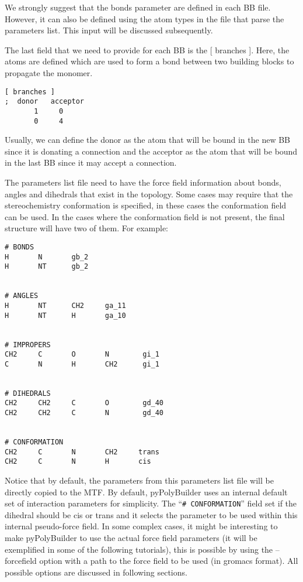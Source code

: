 \documentclass[12pt]{article}
\begin{document}
We strongly suggest that the bonds parameter are defined in each BB file.
However, it can also be defined using the atom types in the file that parse the parameters list.
This input will be discussed subsequently.

The last field that we need to provide for each BB is the [ branches ].
Here, the atoms are defined which are used to form a bond between two building blocks to propagate the monomer.
\begin{lstlisting}
[ branches ]
;  donor   acceptor
       1	 0
       0	 4
\end{lstlisting}

Usually, we can define the donor as the atom that will be bound in the new BB since it is donating a connection and the acceptor as the atom that will be bound in the last BB since it may accept a connection.

The parameters list file need to have the force field information about bonds, angles and dihedrals that exist in the topology.
Some cases may require that the stereochemistry conformation is specified, in these cases the conformation field can be used. In the cases where the conformation field is not present, the  final structure will have two of them. For example:

\begin{lstlisting}
# BONDS
H       N       gb_2
H       NT      gb_2
   

# ANGLES
H       NT      CH2     ga_11
H       NT      H       ga_10


# IMPROPERS
CH2     C       O       N        gi_1
C       N       H       CH2      gi_1


# DIHEDRALS
CH2     CH2     C       O        gd_40
CH2     CH2     C       N        gd_40


# CONFORMATION
CH2     C       N       CH2     trans
CH2     C       N       H       cis  
\end{lstlisting}

Notice that by default, the parameters from this parameters list file will be directly copied to the MTF.
By default, pyPolyBuilder uses an internal default set of interaction parameters for simplicity.
The ``\texttt{\# CONFORMATION}'' field set if the dihedral should be cis or trans and it selects the parameter to be used within this internal pseudo-force field.
In some complex cases, it might be interesting to make pyPolyBuilder to use the actual force field parameters (it will be exemplified in some of the following tutorials), this is possible by using the --forcefield option with a path to the force field to be used (in gromacs format).
All possible options are discussed in following sections.
\end{document}

